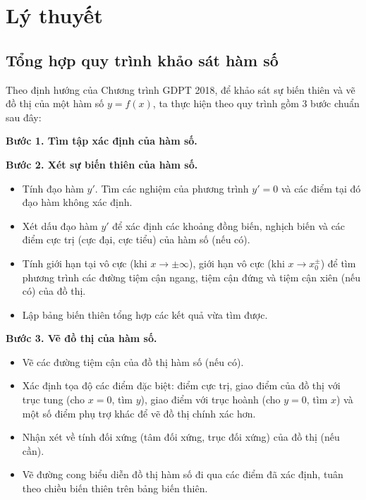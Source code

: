 \documentclass[12pt]{article}
\begin{document}
	\newpage
	
	\setcounter{tocdepth}{2}
	\tableofcontents
	\newpage
	
	\section{Lý thuyết}
	\subsection{Tổng hợp quy trình khảo sát hàm số}
	
	Theo định hướng của Chương trình GDPT 2018, để khảo sát sự biến thiên và vẽ đồ thị của một hàm số $y = f(x)$, ta thực hiện theo quy trình gồm 3 bước chuẩn sau đây:
	
	\textbf{Bước 1. Tìm tập xác định của hàm số.}
	
	\textbf{Bước 2. Xét sự biến thiên của hàm số.}
	\begin{itemize}
		\item Tính đạo hàm $y'$. Tìm các nghiệm của phương trình $y' = 0$ và các điểm tại đó đạo hàm không xác định.
		\item Xét dấu đạo hàm $y'$ để xác định các khoảng đồng biến, nghịch biến và các điểm cực trị (cực đại, cực tiểu) của hàm số (nếu có).
		\item Tính giới hạn tại vô cực (khi $x \to \pm\infty$), giới hạn vô cực (khi $x \to x_0^\pm$) để tìm phương trình các đường tiệm cận ngang, tiệm cận đứng và tiệm cận xiên (nếu có) của đồ thị.
		\item Lập bảng biến thiên tổng hợp các kết quả vừa tìm được.
	\end{itemize}
	
	\textbf{Bước 3. Vẽ đồ thị của hàm số.}
	\begin{itemize}
		\item Vẽ các đường tiệm cận của đồ thị hàm số (nếu có).
		\item Xác định tọa độ các điểm đặc biệt: điểm cực trị, giao điểm của đồ thị với trục tung (cho $x=0$, tìm $y$), giao điểm với trục hoành (cho $y=0$, tìm $x$) và một số điểm phụ trợ khác để vẽ đồ thị chính xác hơn.
		\item Nhận xét về tính đối xứng (tâm đối xứng, trục đối xứng) của đồ thị (nếu cần).
		\item Vẽ đường cong biểu diễn đồ thị hàm số đi qua các điểm đã xác định, tuân theo chiều biến thiên trên bảng biến thiên.
	\end{itemize}
	
\end{document}
